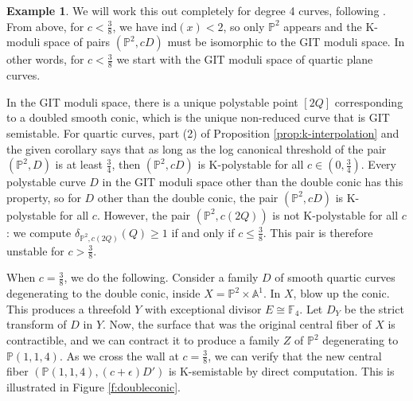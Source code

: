 \documentclass[11pt]{amsart}
\numberwithin{equation}{section}
\theoremstyle{definition}
\newtheorem{example}[theorem]{Example}
\newcommand{\bP}{\mathbb{P}}
\newcommand{\bA}{\mathbb{A}}
\newcommand{\ind}{\mathrm{ind}}
\begin{document}
\begin{example}
We will work this out completely for degree 4 curves, following \cite{ADLpub}.  From above, for  $c < \frac{3}{8}$, we have $\ind(x) < 2$, so only $\bP^2$ appears and the K-moduli space of pairs $(\bP^2,cD)$ must be isomorphic to the GIT moduli space.  In other words, for $c < \frac{3}{8}$ we start with the GIT moduli space of quartic plane curves.  

In the GIT moduli space, there is a unique polystable point $[2Q]$ corresponding to a doubled smooth conic, which is the unique non-reduced curve that is GIT semistable.  For quartic curves, part (2) of Proposition \ref{prop:k-interpolation} and the given corollary says that as long as the log canonical threshold of the pair $(\bP^2,D)$ is at least $\frac{3}{4}$, then $(\bP^2, cD)$ is K-polystable for all $c\in(0,\frac{3}{4})$.  Every polystable curve $D$ in the GIT moduli space other than the double conic has this property, so for $D$ other than the double conic, the pair $(\bP^2, cD)$ is K-polystable for all $c$.  However, the pair $(\bP^2,c(2Q))$ is not K-polystable for all $c$: we compute $\delta_{\bP^2,c(2Q)} (Q) \ge 1$ if and only if $c \le \frac{3}{8}$.  This pair is therefore unstable for $c> \frac{3}{8}$.


When $c = \frac{3}{8}$, we do the following.  Consider a family $D$ of smooth quartic curves degenerating to the double conic, inside $X = \bP^2 \times \bA^1$.  In $X$, blow up the conic.  This produces a threefold $Y$ with exceptional divisor $E \cong \mathbb{F}_4$.  Let $D_Y$ be the strict transform of $D$ in $Y$.  Now, the surface that was the original central fiber of $X$ is contractible, and we can contract it to produce a family $Z$ of $\bP^2$ degenerating to $\bP(1,1,4)$.  As we cross the wall at $c = \frac{3}{8}$, we can verify that the new central fiber $(\bP(1,1,4), (c+ \epsilon)D')$ is K-semistable by direct computation.  This is illustrated in Figure \ref{f:doubleconic}.




\begin{figure}[h]
\end{figure}
\end{example}
\end{document}
